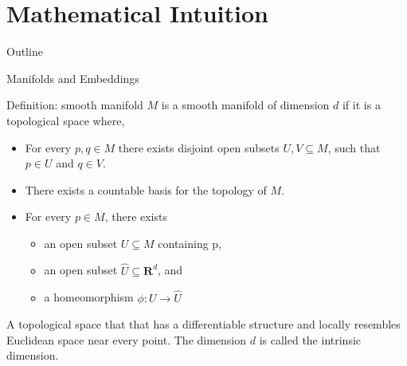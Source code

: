 \documentclass{beamer}
\begin{document}

\section[Mathematical Intuition]{Mathematical Intuition}
\begin{frame}{Outline}
    \tableofcontents[current]
\end{frame}

\begin{frame}{Manifolds and Embeddings}
\begin{block}{Definition: smooth manifold}
$M$ is a smooth manifold of dimension $d$ if it is a topological space where, 
\begin{itemize}
    \item For every $p,q \in M$ there exists disjoint open subsets $U,V \subseteq M$, such that $p \in U$ and $q \in V$.
    \item There exists a countable basis for the topology of $M$.
    \item For every $p \in M$, there exists
    \begin{itemize}
        \item an open subset $U \subseteq M$ containing p,
        \item an open subset $\hat{U} \subseteq \mathbf{R}^d$, and
        \item a homeomorphism $\phi: U \rightarrow \hat{U}$
    \end{itemize}
\end{itemize}
\end{block}
\pause
\begin{block}{}
    A topological space that that has a differentiable structure and locally resembles Euclidean space near every point. The dimension $d$ is called the intrinsic dimension. 
\end{block}
\end{frame}
\end{document}
